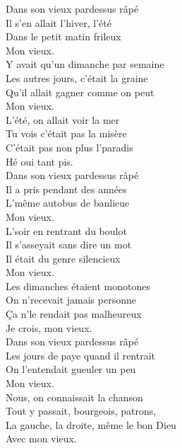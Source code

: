 \documentclass{novel}
\begin{document}
\begin{multicols}{2}
Dans son vieux pardessus râpé \\
Il s'en allait l'hiver, l'été \\
Dans le petit matin frileux \\
Mon vieux. \\

Y avait qu'un dimanche par semaine \\
Les autres jours, c'était la graine \\
Qu'il allait gagner comme on peut \\
Mon vieux. \\

L'été, on allait voir la mer \\
Tu vois c'était pas la misère \\
C'était pas non plus l'paradis \\
Hé oui tant pis. \\

Dans son vieux pardessus râpé \\
Il a pris pendant des années \\
L'même autobus de banlieue \\
Mon vieux. \\

L'soir en rentrant du boulot \\
Il s'asseyait sans dire un mot \\
Il était du genre silencieux \\
Mon vieux. \\

Les dimanches étaient monotones \\
On n'recevait jamais personne \\
Ça n'le rendait pas malheureux \\
Je crois, mon vieux. \\

Dans son vieux pardessus râpé \\
Les jours de paye quand il rentrait \\
On l'entendait gueuler un peu \\
Mon vieux. \\

Nous, on connaissait la chanson \\
Tout y passait, bourgeois, patrons, \\
La gauche, la droite, même le bon Dieu \\
Avec mon vieux. \\


\end{multicols}
\end{document}
